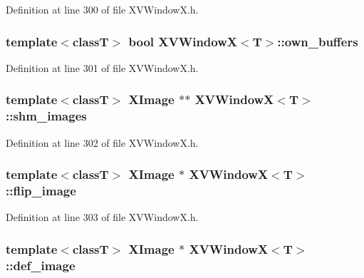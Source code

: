 Definition at line 300 of file XVWindow\-X.h.\label{XVWindowX_n3}
\hypertarget{class_XVWindowX_n3}{
\subsubsection[own_buffers]{\setlength{\rightskip}{0pt plus 5cm}template$<$classT$>$ bool XVWindow\-X$<$T$>$::own\_\-buffers}}




Definition at line 301 of file XVWindow\-X.h.\label{XVWindowX_n4}
\hypertarget{class_XVWindowX_n4}{
\subsubsection[shm_images]{\setlength{\rightskip}{0pt plus 5cm}template$<$classT$>$ XImage $\ast$$\ast$ XVWindow\-X$<$T$>$::shm\_\-images}}




Definition at line 302 of file XVWindow\-X.h.\label{XVWindowX_n5}
\hypertarget{class_XVWindowX_n5}{
\subsubsection[flip_image]{\setlength{\rightskip}{0pt plus 5cm}template$<$classT$>$ XImage $\ast$ XVWindow\-X$<$T$>$::flip\_\-image}}




Definition at line 303 of file XVWindow\-X.h.\label{XVWindowX_n6}
\hypertarget{class_XVWindowX_n6}{
\subsubsection[def_image]{\setlength{\rightskip}{0pt plus 5cm}template$<$classT$>$ XImage $\ast$ XVWindow\-X$<$T$>$::def\_\-image}}




